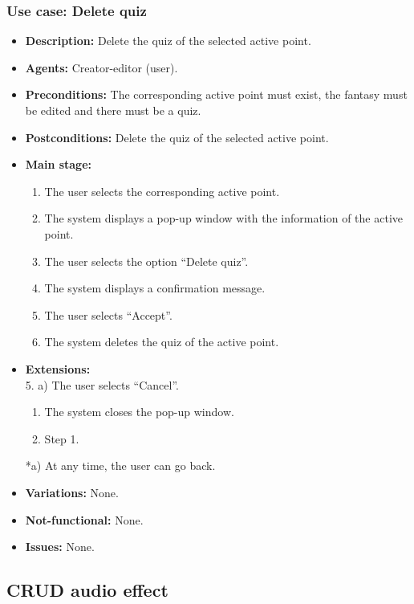 \subsubsection{Use case: Delete quiz}
\begin{itemize}
	\item \textbf{Description:} Delete the quiz of the selected active point.
	\item \textbf{Agents:} Creator-editor (user).
	\item \textbf{Preconditions:} The corresponding active point must exist, the fantasy must be edited and there must be a quiz.
	\item \textbf{Postconditions:} Delete the quiz of the selected active point.
	\item \textbf{Main stage:}
	\begin{enumerate}
		\item The user selects the corresponding active point.
		\item The system displays a pop-up window with the information of the active point.
		\item The user selects the option ``Delete quiz''.
		\item The system displays a confirmation message.
		\item The user selects ``Accept''.
		\item The system deletes the quiz of the active point.
	\end{enumerate}
	\item \textbf{Extensions:} \\ 5. a) The user selects ``Cancel''.
	\begin{enumerate}
		\item The system closes the pop-up window.
		\item Step 1.
	\end{enumerate}
	*a) At any time, the user can go back.
	\item \textbf{Variations:} None.
	\item \textbf{Not-functional:} None.
	\item \textbf{Issues:} None.
\end{itemize}

\subsection{CRUD audio effect}
\hypertarget{crearaudio}{}
